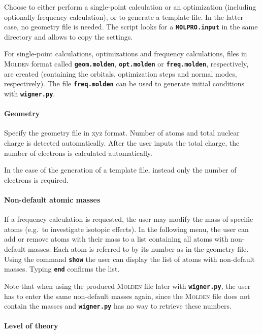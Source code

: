 \documentclass[a4paper,11pt,DIV=15,openany,twoside=false]{scrbook}
\newcommand{\ttt}[1]{\textbf{\texttt{#1}}}
\begin{document}
Choose to either perform a single-point calculation or an optimization (including optionally frequency calculation), or to generate a template file. In the latter case, no geometry file is needed. The script looks for a \ttt{MOLPRO.input} in the same directory and allows to copy the settings. 

For single-point calculations, optimizations and frequency calculations, files in \textsc{Molden} format called \ttt{geom.molden}, \ttt{opt.molden} or \ttt{freq.molden}, respectively, are created (containing the orbitals, optimization steps and normal modes, respectively). The file \ttt{freq.molden} can be used to generate initial conditions with \ttt{wigner.py}.

\paragraph{Geometry}

Specify the geometry file in xyz format. Number of atoms and total nuclear charge is detected automatically. After the user inputs the total charge, the number of electrons is calculated automatically.

In the case of the generation of a template file, instead only the number of electrons is required.

\paragraph{Non-default atomic masses}

If a frequency calculation is requested, the user may modify the mass of specific atoms (e.g.\ to investigate isotopic effects). In the following menu, the user can add or remove atoms with their mass to a list containing all atoms with non-default masses. Each atom is referred to by its number as in the geometry file. Using the command \ttt{show} the user can display the list of atoms with non-default masses. Typing \ttt{end} confirms the list.

Note that when using the produced \textsc{Molden} file later with \ttt{wigner.py}, the user has to enter the same non-default masses again, since the \textsc{Molden} file does not contain the masses and \ttt{wigner.py} has no way to retrieve these numbers.

\paragraph{Level of theory}
\end{document}
